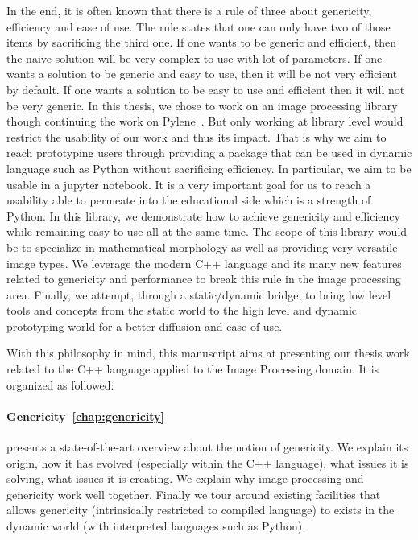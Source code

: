 
In the end,  it is often known that there is a rule of three about genericity, efficiency and
ease of use. The rule states that one can only have two of those items by sacrificing the third one. If one wants to be
generic and efficient, then the naive solution will be very complex to use with lot of parameters. If one wants a
solution to be generic and easy to use, then it will be not very efficient by default. If one wants a solution to be
easy to use and efficient then it will not be very generic. In this thesis, we chose to work on an image processing
library though continuing the work on Pylene~\cite{carlinet.2018.pylena}. But only working at library level would
restrict the usability of our work and thus its impact. That is why we aim to reach prototyping users through providing
a package that can be used in dynamic language such as Python without sacrificing efficiency. In particular, we aim to
be usable in a jupyter notebook. It is a very important goal for us to reach a usability able to permeate into the
educational side which is a strength of Python. In this library, we demonstrate how to achieve genericity and efficiency
while remaining easy to use all at the same time. The scope of this library would be to specialize in mathematical
morphology as well as providing very versatile image types. We leverage the modern C++ language and its many new
features related to genericity and performance to break this rule in the image processing area. Finally, we attempt,
through a static/dynamic bridge, to bring low level tools and concepts from the static world to the high level and
dynamic prototyping world for a better diffusion and ease of use.

With this philosophy in mind, this manuscript aims at presenting our thesis work related to the C++ language applied to
the Image Processing domain. It is organized as followed:

\paragraph{Genericity~\ref{chap:genericity}} presents a state-of-the-art overview about the notion of genericity. We
explain its origin, how it has evolved (especially within the C++ language), what issues it is solving, what issues it
is creating. We explain why image processing and genericity work well together. Finally we tour around existing
facilities that allows genericity (intrinsically restricted to compiled language) to exists in the dynamic world (with
interpreted languages such as Python).

